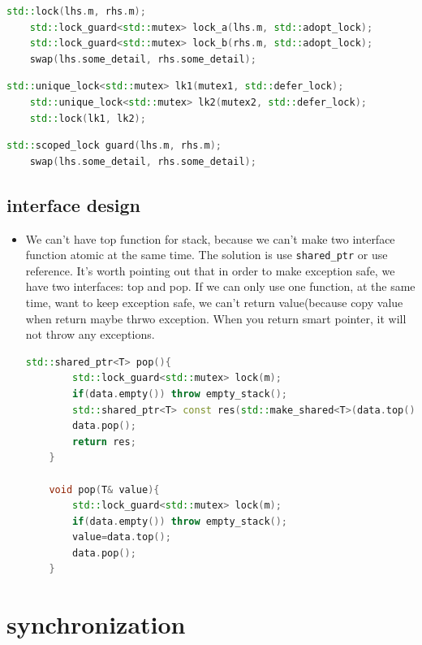 \documentclass[a4paper,11pt,twoside]{book}
\begin{document}
\begin{itemize}
\begin{lstlisting}[frame=single, language=c++]
	std::lock(lhs.m, rhs.m);
	std::lock_guard<std::mutex> lock_a(lhs.m, std::adopt_lock);
	std::lock_guard<std::mutex> lock_b(rhs.m, std::adopt_lock);
	swap(lhs.some_detail, rhs.some_detail);
\end{lstlisting}

\begin{lstlisting}[frame=single, language=c++]	
	std::unique_lock<std::mutex> lk1(mutex1, std::defer_lock);
	std::unique_lock<std::mutex> lk2(mutex2, std::defer_lock);
	std::lock(lk1, lk2);
\end{lstlisting}


\begin{lstlisting}[frame=single, language=c++]
	std::scoped_lock guard(lhs.m, rhs.m);
	swap(lhs.some_detail, rhs.some_detail);
\end{lstlisting}	
	
\end{itemize}

\subsection{interface design}
\begin{itemize}
	
	\item We can't have top function for stack, because we can't make two interface function atomic at the same time. The solution is use \texttt{shared\_ptr} or use reference. It's worth pointing out that in order to make exception safe, we have two interfaces: top and pop. If we can only use one function, at the same time, want to keep exception safe, we can't return value(because copy value when return maybe thrwo exception. When you return smart pointer, it will not throw any exceptions.
	
\begin{lstlisting}[frame=single, language=c++]
	std::shared_ptr<T> pop(){
		std::lock_guard<std::mutex> lock(m);
		if(data.empty()) throw empty_stack();
		std::shared_ptr<T> const res(std::make_shared<T>(data.top()));
		data.pop();
		return res;
	}
	
	void pop(T& value){
		std::lock_guard<std::mutex> lock(m);
		if(data.empty()) throw empty_stack();
		value=data.top();
		data.pop();
	}	
\end{lstlisting}	
	
\end{itemize}


\section{synchronization}
\end{document}
